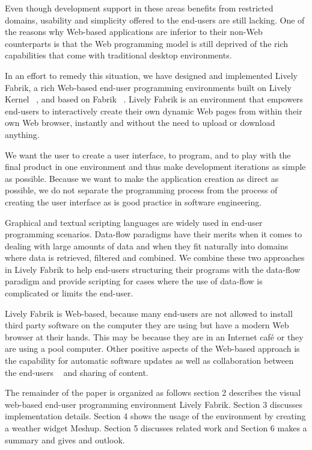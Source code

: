 \documentclass[pdftex, times, 10pt, twocolumn]{article}
\begin{document}
Even though development support in these areas benefits from restricted domains, usability and simplicity offered to the end-users are still lacking. One of the reasons why Web-based applications are inferior to their non-Web counterparts is that the Web programming model is still deprived of the rich capabilities that come with traditional desktop environments. 

In an effort to remedy this situation, we have designed and implemented Lively Fabrik, a rich Web-based end-user programming environments built on Lively Kernel ~\cite{Ingalls2007SLL}, and based on Fabrik ~\cite{Ingalls1988FVP}. Lively Fabrik is an environment that empowers end-users to interactively create their own dynamic Web pages from within their own Web browser, instantly and without the need to upload or download anything. 

We want the user to create a user interface, to program, and to play with the final product in one environment and thus make development iterations as simple as possible. Because we want to make the application creation as direct as possible, we do not separate the programming process from the process of creating the user interface as is good practice in software engineering. 

Graphical and textual scripting languages are widely used in end-user programming scenarios. Data-flow paradigms have their merits when it comes to dealing with large amounts of data and when they fit naturally into domains where data is retrieved, filtered and combined. We combine these two approaches in Lively Fabrik to help end-users structuring their programs with the data-flow paradigm and provide scripting for cases where the use of data-flow is complicated or limits the end-user.  

Lively Fabrik is Web-based, because many end-users are not allowed to install third party software on the computer they are using but have a modern Web browser at their hands. This may be because they are in an Internet café or they are using a pool computer. Other positive aspects of the Web-based approach is the capability for automatic software updates as well as collaboration between the end-users ~\cite{Ohshima2007TLW} and sharing of content.  

The remainder of the paper is organized as follows section 2 describes the visual web-based end-user programming environment Lively Fabrik. Section 3 discusses implementation details. Section 4 shows the usage of the environment by creating a weather widget Meshup. Section 5 discusses related work and Section 6 makes a summary and gives and outlook. 
\end{document}
